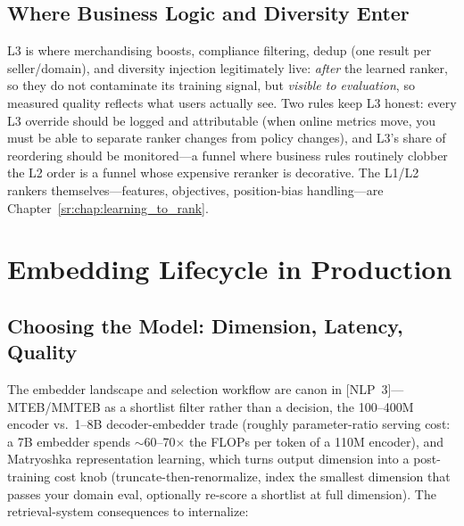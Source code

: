 \subsection{Where Business Logic and Diversity Enter}

L3 is where merchandising boosts, compliance filtering, dedup (one result per seller/domain), and diversity injection legitimately live: \textit{after} the learned ranker, so they do not contaminate its training signal, but \textit{visible to evaluation}, so measured quality reflects what users actually see. Two rules keep L3 honest: every L3 override should be logged and attributable (when online metrics move, you must be able to separate ranker changes from policy changes), and L3's share of reordering should be monitored---a funnel where business rules routinely clobber the L2 order is a funnel whose expensive reranker is decorative. The L1/L2 rankers themselves---features, objectives, position-bias handling---are Chapter~\ref{sr:chap:learning_to_rank}.

\section{Embedding Lifecycle in Production}
\label{sr:sec:embedder_selection}

\subsection{Choosing the Model: Dimension, Latency, Quality}

The embedder landscape and selection workflow are canon in [NLP~3]---MTEB/MMTEB as a shortlist filter rather than a decision, the 100--400M encoder vs.\ 1--8B decoder-embedder trade (roughly parameter-ratio serving cost: a 7B embedder spends $\sim$60--70$\times$ the FLOPs per token of a 110M encoder), and Matryoshka representation learning, which turns output dimension into a post-training cost knob (truncate-then-renormalize, index the smallest dimension that passes your domain eval, optionally re-score a shortlist at full dimension). The retrieval-system consequences to internalize:

